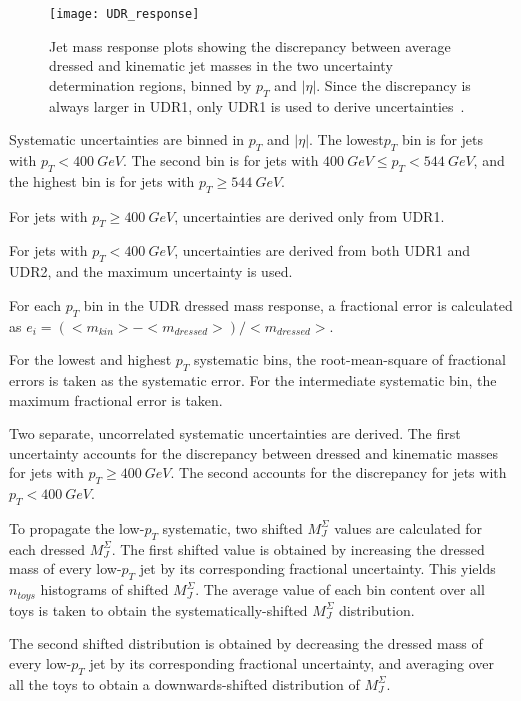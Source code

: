 \begin{figure}[!ht]
    \texttt{[image: UDR\_response]}
    \caption{Jet mass response plots showing the discrepancy between average dressed and kinematic jet masses in the two uncertainty
    determination regions, binned by $p_T$ and $|\eta|$.
    Since the discrepancy is always larger in UDR1, only UDR1 is used to derive uncertainties~\cite{paper-plb}.}
    \label{fig:udr_response}
\end{figure}

Systematic uncertainties are binned in $p_{T}$ and $|\eta|$.
The lowest$p_{T}$ bin is for jets with $p_{T} < 400~GeV$.
The second bin is for jets with $400~GeV \leq p_T < 544~GeV$, and the highest bin is for jets with $p_T \geq 544~GeV$.

For jets with $p_{T} \geq 400~GeV$, uncertainties are derived only from UDR1.

For jets with $p_{T} < 400~GeV$, uncertainties are derived from both UDR1 and UDR2, and the maximum uncertainty is used.

For each $p_T$ bin in the UDR dressed mass response, a fractional error is calculated as $e_i=\left(<m_{kin}>-<m_{dressed}>\right)/<m_{dressed}>$.

For the lowest and highest $p_T$ systematic bins, the root-mean-square of fractional errors is taken as the systematic error.
For the intermediate systematic bin, the maximum fractional error is taken.

Two separate, uncorrelated systematic uncertainties are derived.
The first uncertainty accounts for the discrepancy between dressed and kinematic masses for jets with $p_T \geq 400~GeV$.
The second accounts for the discrepancy for jets with $p_T < 400~GeV$.

To propagate the low-$p_T$ systematic, two shifted $M_{J}^{\Sigma}$ values are calculated for each dressed $M_{J}^{\Sigma}$.
The first shifted value is obtained by increasing the dressed mass of every low-$p_T$ jet by its corresponding fractional uncertainty.
This yields $n_{toys}$ histograms of shifted $M_{J}^{\Sigma}$.
The average value of each bin content over all toys is taken to obtain the systematically-shifted $M_{J}^{\Sigma}$ distribution.

The second shifted distribution is obtained by decreasing the dressed mass of every low-$p_T$ jet by its corresponding fractional uncertainty,
and averaging over all the toys to obtain a downwards-shifted distribution of $M_{J}^{\Sigma}$.

